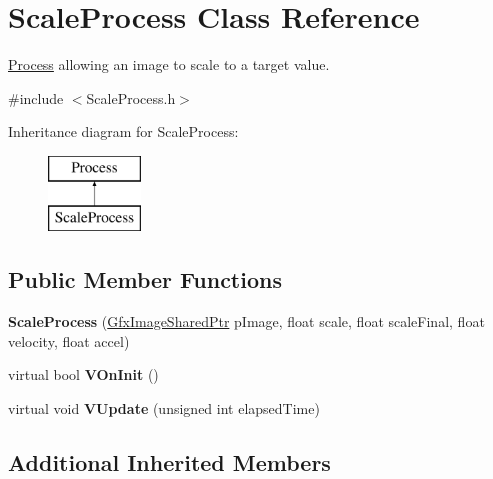 \hypertarget{classScaleProcess}{\section{Scale\-Process Class Reference}
\label{classScaleProcess}
}


\hyperlink{classProcess}{Process} allowing an image to scale to a target value.  




{\ttfamily \#include $<$Scale\-Process.\-h$>$}

Inheritance diagram for Scale\-Process\-:\begin{figure}[H]
\begin{center}
\leavevmode
\includegraphics[height=2.000000cm]{classScaleProcess}
\end{center}
\end{figure}
\subsection*{Public Member Functions}
\begin{DoxyCompactItemize}
\item 
\hypertarget{classScaleProcess_a6b2f3e06eef1066324d903b97a06d4dd}{{\bfseries Scale\-Process} (\hyperlink{GfxImage_8h_a42b2baf6110731a1a358d365e303e086}{Gfx\-Image\-Shared\-Ptr} p\-Image, float scale, float scale\-Final, float velocity, float accel)}\label{classScaleProcess_a6b2f3e06eef1066324d903b97a06d4dd}

\item 
\hypertarget{classScaleProcess_aed091624670d7e33bd901d2f5f101d44}{virtual bool {\bfseries V\-On\-Init} ()}\label{classScaleProcess_aed091624670d7e33bd901d2f5f101d44}

\item 
\hypertarget{classScaleProcess_ae900a004bde818c575d8ff64a5df25da}{virtual void {\bfseries V\-Update} (unsigned int elapsed\-Time)}\label{classScaleProcess_ae900a004bde818c575d8ff64a5df25da}

\end{DoxyCompactItemize}
\subsection*{Additional Inherited Members}


